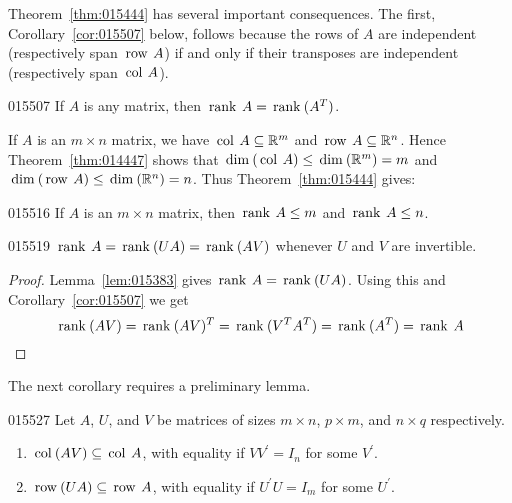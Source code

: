 {{Theorem~\ref{thm:015444} has several important consequences. The first, Corollary~\ref{cor:015507} below, follows because the rows of $A$ are independent (respectively span $\thinspace\operatorname{row\medspace} A$) if and only if their transposes are independent (respectively span $\thinspace\operatorname{col\medspace} A$).

\begin{corollary}{}{015507}
If $A$ is any matrix, then $\thinspace\operatorname{rank\medspace} A = \thinspace\operatorname{rank\medspace}(A^{T})$.
\end{corollary}

If $A$ is an $m \times n$ matrix, we have $\thinspace\operatorname{col\medspace} A \subseteq \mathbb{R}^m$ and $\thinspace\operatorname{row\medspace} A \subseteq \mathbb{R}^n$. Hence Theorem~\ref{thm:014447} shows that $\thinspace\operatorname{dim\medspace}(\thinspace\operatorname{col\medspace} A) \leq \thinspace\operatorname{dim\medspace}(\mathbb{R}^m) = m$ and $\thinspace\operatorname{dim\medspace}(\thinspace\operatorname{row\medspace} A) \leq \thinspace\operatorname{dim\medspace}(\mathbb{R}^n) = n$. Thus Theorem~\ref{thm:015444} gives:

\begin{corollary}{}{015516}
If $A$ is an $m \times n$ matrix, then $\thinspace\operatorname{rank \medspace}A \leq m$  and $\thinspace\operatorname{rank \medspace}A \leq n$.
\end{corollary}

\begin{corollary}{}{015519}
$\thinspace\operatorname{rank\medspace} A = \thinspace\operatorname{rank\medspace}(UA) = \thinspace\operatorname{rank\medspace}(AV)$ whenever $U$ and $V$ are invertible.
\end{corollary}

\begin{proof}
Lemma~\ref{lem:015383} gives $\thinspace\operatorname{rank\medspace} A = \thinspace\operatorname{rank\medspace}(UA)$. Using this and Corollary~\ref{cor:015507} we get
\begin{equation*}
\thinspace\operatorname{rank\medspace} (AV) = \thinspace\operatorname{rank\medspace}(AV)^T = \thinspace\operatorname{rank\medspace} (V^TA^T) = \thinspace\operatorname{rank\medspace}(A^T)= \thinspace\operatorname{rank \medspace} A
\end{equation*}
\vspace*{-2em}\end{proof}

The next corollary requires a preliminary lemma.

\begin{lemma}{}{015527}
Let $A$, $U$, and $V$ be matrices of sizes $m \times n$, $p \times m$,
and $n \times q$ respectively.

\begin{enumerate}
\item $\thinspace\operatorname{col\medspace}(AV) \subseteq \thinspace\operatorname{col\medspace} A$, with equality if $VV^{\prime}= I_{n}$ for some $V^{\prime}$.

\item $\thinspace\operatorname{row\medspace}(UA) \subseteq \thinspace\operatorname{row\medspace} A$, with equality if $U^{\prime}U=I_{m}$ for some $U^{\prime}$.


\end{enumerate}
\end{lemma}}}
